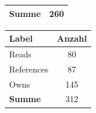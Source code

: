 \begin{table}[htb]
\begin{subtable}[c]{0.3\textwidth}
\begin{tabular}{|l|c|}
                \textbf{Summe}  & 260                                  \\ \hline
            \end{tabular}
            \label{table:findingsNewsFiguresContentNodesByClass}
        \end{subtable}
        \begin{subtable}[c]{0.3\textwidth}
            \centering
            \begin{tabular}{|l|c|}
                \hline
                \textbf{Label} & \multicolumn{1}{l|}{\textbf{Anzahl}} \\ \hline
                Reads          & 80                                   \\ \hline
                References     & 87                                   \\ \hline
                Owns           & 145                                  \\ \hline
                \hline
                \textbf{Summe} & 312                                  \\ \hline
                \end{tabular}
            \label{table:findingNewsFiguresEdgesByLabel}
        \end{subtable}


\end{table}
